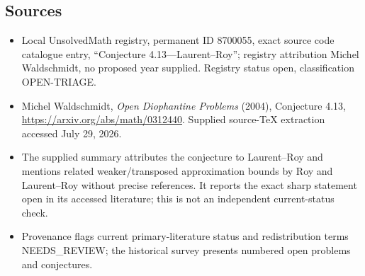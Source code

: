 \documentclass[11pt]{article}
\begin{document}
\subsection{Sources}
\begin{itemize}
\item Local UnsolvedMath registry, permanent ID 8700055, exact source code catalogue entry, ``Conjecture 4.13---Laurent--Roy''; registry attribution Michel Waldschmidt, no proposed year supplied. Registry status open, classification OPEN-TRIAGE.
\item Michel Waldschmidt, \emph{Open Diophantine Problems} (2004), Conjecture 4.13, \url{https://arxiv.org/abs/math/0312440}. Supplied source-TeX extraction accessed July 29, 2026.
\item The supplied summary attributes the conjecture to Laurent--Roy and mentions related weaker/transposed approximation bounds by Roy and Laurent--Roy without precise references. It reports the exact sharp statement open in its accessed literature; this is not an independent current-status check.
\item Provenance flags current primary-literature status and redistribution terms NEEDS\_REVIEW; the historical survey presents numbered open problems and conjectures.
\end{itemize}
\end{document}
